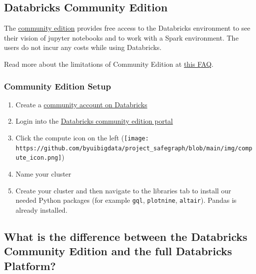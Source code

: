 \documentclass[
  letterpaper,
  DIV=11,
  numbers=noendperiod]{scrreprt}
\providecommand{\tightlist}{%
  \setlength{\itemsep}{0pt}\setlength{\parskip}{0pt}}\usepackage{longtable,booktabs,array}
\begin{document}
\hypertarget{databricks-community-edition}{%
\subsection{Databricks Community
Edition}\label{databricks-community-edition}}

The \href{https://community.cloud.databricks.com/login.html}{community
edition} provides free access to the Databricks environment to see their
vision of jupyter notebooks and to work with a Spark environment. The
users do not incur any costs while using Databricks.

Read more about the limitations of Community Edition at
\href{https://databricks.com/product/faq/community-edition}{this FAQ}.

\hypertarget{community-edition-setup}{%
\subsubsection{Community Edition Setup}\label{community-edition-setup}}

\begin{enumerate}
\def\labelenumi{\arabic{enumi}.}
\tightlist
\item
  Create a \href{https://databricks.com/try-databricks}{community
  account on Databricks}
\item
  Login into the
  \href{https://community.cloud.databricks.com/login.html}{Databricks
  community edition portal}
\item
  Click the compute icon on the left
  (\texttt{[image: https://github.com/byuibigdata/project\_safegraph/blob/main/img/compute\_icon.png]})
\item
  Name your cluster
\item
  Create your cluster and then navigate to the libraries tab to install
  our needed Python packages (for example \texttt{gql},
  \texttt{plotnine}, \texttt{altair}). Pandas is already installed.
\end{enumerate}

\hypertarget{what-is-the-difference-between-the-databricks-community-edition-and-the-full-databricks-platform}{%
\subsection{What is the difference between the Databricks Community
Edition and the full Databricks
Platform?}\label{what-is-the-difference-between-the-databricks-community-edition-and-the-full-databricks-platform}}
\end{document}
